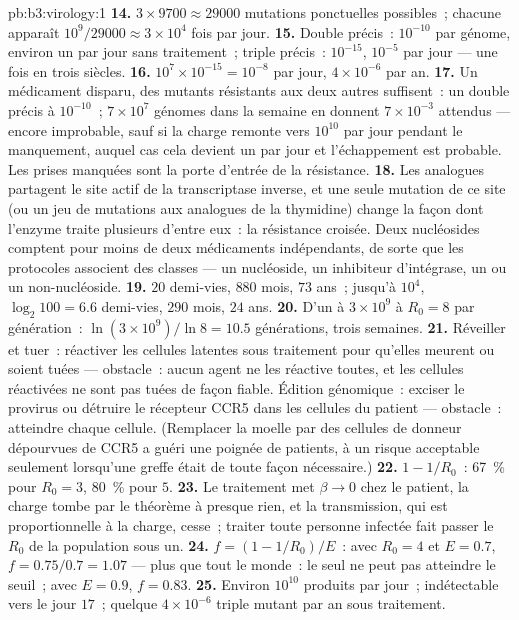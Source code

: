 \begin{solution}{pb:b3:virology:1}
\textbf{14.} $3\times 9700 \approx \num{29000}$ mutations ponctuelles
possibles~; chacune apparaît $10^{9}/\num{29000} \approx 3\times 10^{4}$
fois par jour.
\textbf{15.} Double précis~: $10^{-10}$ par génome, environ un par jour
sans traitement~; triple précis~: $10^{-15}$, $10^{-5}$ par jour ---
une fois en trois siècles.
\textbf{16.} $10^{7}\times 10^{-15} = 10^{-8}$ par jour, $4\times 10^{-6}$
par an.
\textbf{17.} Un médicament disparu, des mutants résistants aux deux
autres suffisent~: un double précis à $10^{-10}$~; $7\times 10^{7}$
génomes dans la semaine en donnent $7\times 10^{-3}$ attendus ---
encore improbable, sauf si la charge remonte vers $10^{10}$ par jour
pendant le manquement, auquel cas cela devient un par jour et
l'échappement est probable. Les prises manquées sont la porte d'entrée
de la résistance.
\textbf{18.} Les analogues partagent le site actif de la transcriptase
inverse, et une seule mutation de ce site (ou un jeu de mutations aux
analogues de la thymidine) change la façon dont l'enzyme traite
plusieurs d'entre eux~: la résistance croisée. Deux nucléosides
comptent pour moins de deux médicaments indépendants, de sorte que les
protocoles associent des classes --- un nucléoside, un inhibiteur
d'intégrase, un  ou un non-nucléoside.
\textbf{19.} $20$ demi-vies, $880$ mois, $73$ ans~; jusqu'à $10^{4}$,
$\log_{2}100 = 6.6$ demi-vies, $290$ mois, $24$ ans.
\textbf{20.} D'un  à $3\times 10^{9}$ à $R_{0} = 8$ par
génération~: $\ln(3\times 10^{9})/\ln 8 = 10.5$ générations, trois
semaines.
\textbf{21.} Réveiller et tuer~: réactiver les cellules latentes sous
traitement pour qu'elles meurent ou soient tuées --- obstacle~: aucun
agent ne les réactive toutes, et les cellules réactivées ne sont pas
tuées de façon fiable. Édition génomique~: exciser le provirus ou
détruire le récepteur CCR5 dans les cellules du patient --- obstacle~:
atteindre chaque cellule. (Remplacer la moelle par des cellules de
donneur dépourvues de CCR5 a guéri une poignée de patients, à un risque
acceptable seulement lorsqu'une greffe était de toute façon
nécessaire.)
\textbf{22.} $1 - 1/R_{0}$~: \qty{67}{\%} pour $R_{0} = 3$,
\qty{80}{\%} pour $5$.
\textbf{23.} Le traitement met $\beta \to 0$ chez le patient, la charge
tombe par le théorème à presque rien, et la transmission, qui est
proportionnelle à la charge, cesse~; traiter toute personne infectée
fait passer le $R_{0}$ de la population sous un.
\textbf{24.} $f = (1 - 1/R_{0})/E$~: avec $R_{0} = 4$ et $E = 0.7$, $f =
0.75/0.7 = 1.07$ --- plus que tout le monde~: le  seul ne peut
pas atteindre le seuil~; avec $E = 0.9$, $f = 0.83$.
\textbf{25.} Environ $10^{10}$  produits par jour~; indétectable
vers le jour $17$~; quelque $4\times 10^{-6}$ triple mutant par an sous
traitement.
\end{solution}
